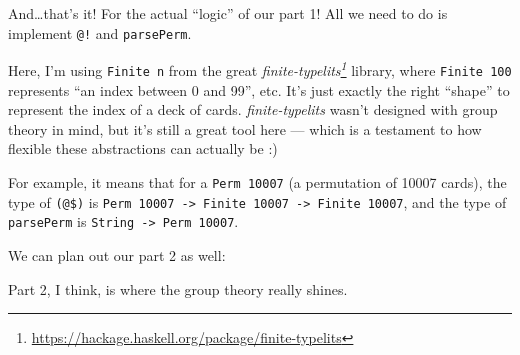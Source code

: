 \documentclass[]{article}
\newenvironment{Shaded}{}{}
\newcommand{\CommentTok}[1]{\textcolor[rgb]{0.38,0.63,0.69}{\textit{#1}}}
\newcommand{\DataTypeTok}[1]{\textcolor[rgb]{0.56,0.13,0.00}{#1}}
\newcommand{\DecValTok}[1]{\textcolor[rgb]{0.25,0.63,0.44}{#1}}
\newcommand{\FunctionTok}[1]{\textcolor[rgb]{0.02,0.16,0.49}{#1}}
\newcommand{\KeywordTok}[1]{\textcolor[rgb]{0.00,0.44,0.13}{\textbf{#1}}}
\newcommand{\NormalTok}[1]{#1}
\newcommand{\OperatorTok}[1]{\textcolor[rgb]{0.40,0.40,0.40}{#1}}
\newcommand{\OtherTok}[1]{\textcolor[rgb]{0.00,0.44,0.13}{#1}}
\renewcommand{\href}[2]{#2\footnote{\url{#1}}}
\begin{document}
And\ldots that's it! For the actual ``logic'' of our part 1! All we need to do
is implement \texttt{@!} and \texttt{parsePerm}.

Here, I'm using \texttt{Finite\ n} from the great
\emph{\href{https://hackage.haskell.org/package/finite-typelits}{finite-typelits}}
library, where \texttt{Finite\ 100} represents ``an index between 0 and 99'',
etc. It's just exactly the right ``shape'' to represent the index of a deck of
cards. \emph{finite-typelits} wasn't designed with group theory in mind, but
it's still a great tool here --- which is a testament to how flexible these
abstractions can actually be :)

For example, it means that for a \texttt{Perm\ 10007} (a permutation of 10007
cards), the type of \texttt{(@\$)} is
\texttt{Perm\ 10007\ -\textgreater{}\ Finite\ 10007\ -\textgreater{}\ Finite\ 10007},
and the type of \texttt{parsePerm} is
\texttt{String\ -\textgreater{}\ Perm\ 10007}.

We can plan out our part 2 as well:

\begin{Shaded}
\end{Shaded}

Part 2, I think, is where the group theory really shines.
\end{document}
